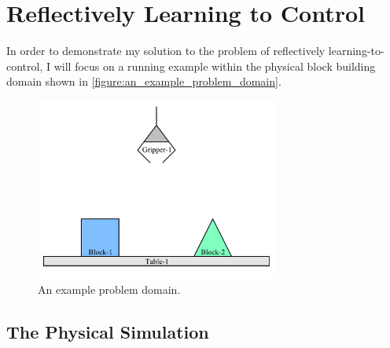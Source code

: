 \chapter{Reflectively Learning to Control}
\label{chapter:reflectively_learning_to_control}


In order to demonstrate my solution to the problem of reflectively
learning-to-control, I will focus on a running example within the
physical block building domain shown in
\autoref{figure:an_example_problem_domain}.
\begin{figure}
\begin{center}
\includegraphics[width=8cm]{gfx/blocks_world_example-1}
\end{center}
\caption[An example problem domain.]{An example problem domain.}
\label{figure:an_example_problem_domain}
\end{figure}

\section{The Physical Simulation}

